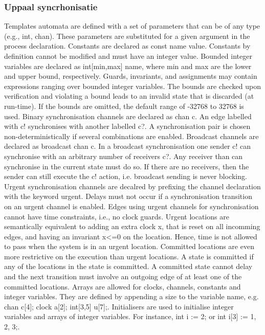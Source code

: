 \subsubsection{Uppaal syncrhonisatie}




Templates automata are defined with a set of parameters that can be of any
type (e.g., int, chan). These parameters are substituted for a given argument
in the process declaration.
Constants are declared as const name value. Constants by definition cannot
be modified and must have an integer value.
Bounded integer variables are declared as int[min,max] name, where min
and max are the lower and upper bound, respectively. Guards, invariants, and
assignments may contain expressions ranging over bounded integer variables.
The bounds are checked upon verification and violating a bound leads to an
invalid state that is discarded (at run-time). If the bounds are omitted, the
default range of -32768 to 32768 is used.
Binary synchronisation channels are declared as chan c. An edge labelled
with c! synchronises with another labelled c?. A synchronisation pair is
chosen non-deterministically if several combinations are enabled.
Broadcast channels are declared as broadcast chan c. In a broadcast synchronisation
one sender c! can synchronise with an arbitrary number of
receivers c?. Any receiver than can synchronise in the current state must do
so. If there are no receivers, then the sender can still execute the c! action,
i.e. broadcast sending is never blocking.
Urgent synchronisation channels are decalred by prefixing the channel declaration
with the keyword urgent. Delays must not occur if a synchronisation
transition on an urgent channel is enabled. Edges using urgent channels for
synchronisation cannot have time constraints, i.e., no clock guards.
Urgent locations are semantically equivalent to adding an extra clock x, that
is reset on all incomming edges, and having an invariant x<=0 on the location.
Hence, time is not allowed to pass when the system is in an urgent location.
Committed locations are even more restrictive on the execution than urgent
locations. A state is committed if any of the locations in the state is committed.
A committed state cannot delay and the next transition must involve
an outgoing edge of at least one of the committed locations.
Arrays are allowed for clocks, channels, constants and integer variables. They
are defined by appending a size to the variable name, e.g. chan c[4]; clock
a[2]; int[3,5] u[7];.
Initialisers are used to initialise integer variables and arrays of integer variables.
For instance, int i := 2; or int i[3] := {1, 2, 3};.



